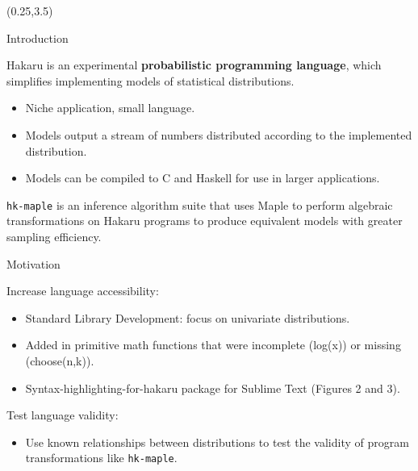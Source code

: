 \documentclass[22pt]{beamer}
\begin{document}
\begin{frame}[fragile]
\begin{textblock}{5}(0.25,3.5)


\begin{block}{\Large{Introduction}}
\justifying

\small{Hakaru is an experimental \textbf{probabilistic programming language}, which simplifies implementing models of statistical distributions.

\begin{itemize}
    \item Niche application, small language.
    \item Models output a stream of numbers  distributed according to the implemented distribution.
    \item Models can be compiled to C and Haskell for use in larger applications.
\end{itemize}

}

\bigskip
\small{{\tt \small{hk-maple}} is an inference algorithm suite that uses Maple to perform algebraic transformations on Hakaru programs to produce equivalent models with greater sampling efficiency.}

\end{block}


\begin{block}{\Large{Motivation}}
\justifying

\small{Increase language accessibility:
\begin{itemize}
  \item Standard Library Development: focus on univariate distributions.
  \item Added in primitive math functions that were incomplete (log(x)) or missing (choose(n,k)). 
  \item Syntax-highlighting-for-hakaru package for Sublime Text (Figures 2 and 3).
\end{itemize}
}

\bigskip
\small{Test language validity: 
\begin{itemize}
  \item Use known relationships between distributions to test the validity of program transformations like {\tt \small{hk-maple}}.
\end{itemize} }
\justifying



\end{block}
\end{textblock}
\end{frame}
\end{document}
